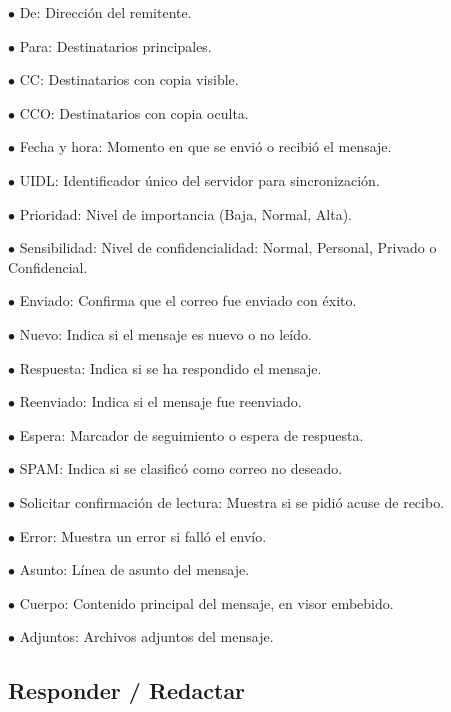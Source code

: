 \documentclass[a4paper]{article}
\begin{document}
\begin{compactitem}
\item[\color{myblue}$\bullet$] De: Dirección del remitente.
\item[\color{myblue}$\bullet$] Para: Destinatarios principales.
\item[\color{myblue}$\bullet$] CC: Destinatarios con copia visible.
\item[\color{myblue}$\bullet$] CCO: Destinatarios con copia oculta.
\item[\color{myblue}$\bullet$] Fecha y hora: Momento en que se envió o recibió el mensaje.
\item[\color{myblue}$\bullet$] UIDL: Identificador único del servidor para sincronización.
\item[\color{myblue}$\bullet$] Prioridad: Nivel de importancia (Baja, Normal, Alta).
\item[\color{myblue}$\bullet$] Sensibilidad: Nivel de confidencialidad: Normal, Personal, Privado o Confidencial.
\item[\color{myblue}$\bullet$] Enviado: Confirma que el correo fue enviado con éxito.
\item[\color{myblue}$\bullet$] Nuevo: Indica si el mensaje es nuevo o no leído.
\item[\color{myblue}$\bullet$] Respuesta: Indica si se ha respondido el mensaje.
\item[\color{myblue}$\bullet$] Reenviado: Indica si el mensaje fue reenviado.
\item[\color{myblue}$\bullet$] Espera: Marcador de seguimiento o espera de respuesta.
\item[\color{myblue}$\bullet$] SPAM: Indica si se clasificó como correo no deseado.
\item[\color{myblue}$\bullet$] Solicitar confirmación de lectura: Muestra si se pidió acuse de recibo.
\item[\color{myblue}$\bullet$] Error: Muestra un error si falló el envío.
\item[\color{myblue}$\bullet$] Asunto: Línea de asunto del mensaje.
\item[\color{myblue}$\bullet$] Cuerpo: Contenido principal del mensaje, en visor embebido.
\item[\color{myblue}$\bullet$] Adjuntos: Archivos adjuntos del mensaje.
\end{compactitem}

\hypertarget{toc94}{}
\subsection{Responder / Redactar}
\end{document}
